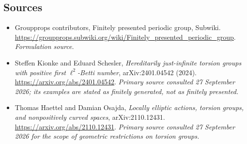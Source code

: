 \documentclass[11pt]{article}
\begin{document}
\subsection{Sources}
\begin{itemize}
\item[S1]Groupprops contributors, Finitely presented periodic group, Subwiki.
\url{https://groupprops.subwiki.org/wiki/Finitely_presented_periodic_group}.
\textit{Formulation source.}
\item[E1]Steffen Kionke and Eduard Schesler, \emph{Hereditarily just-infinite torsion groups with positive first $\ell^2$-Betti number}, arXiv:2401.04542 (2024).
\url{https://arxiv.org/abs/2401.04542}.
\textit{Primary source consulted 27 September 2026; its examples are stated as finitely generated, not as finitely presented.}
\item[E2]Thomas Haettel and Damian Osajda, \emph{Locally elliptic actions, torsion groups, and nonpositively curved spaces}, arXiv:2110.12431.
\url{https://arxiv.org/abs/2110.12431}.
\textit{Primary source consulted 27 September 2026 for the scope of geometric restrictions on torsion groups.}
\end{itemize}
\end{document}
